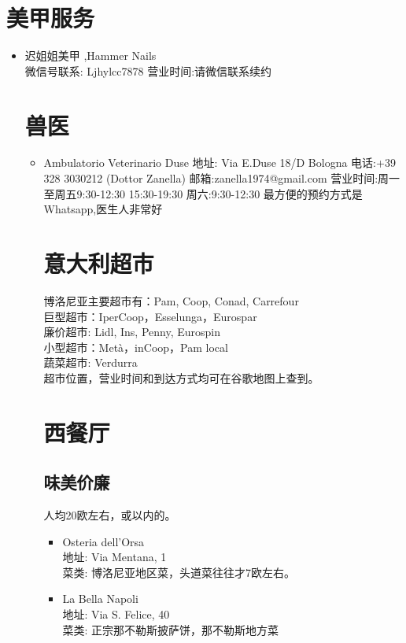 \section{美甲服务}
\begin{itemize}
\item 迟姐姐美甲 ,Hammer Nails\\
微信号联系: Ljhylcc7878
营业时间:请微信联系续约

\section{兽医}
\begin{itemize}
\item Ambulatorio Veterinario Duse
地址: Via E.Duse 18/D Bologna  电话:+39 328 3030212 (Dottor Zanella)
邮箱:zanella1974@gmail.com
营业时间:周一至周五9:30-12:30  15:30-19:30  周六:9:30-12:30
最方便的预约方式是Whatsapp,医生人非常好

\section{意大利超市}
\noindent 博洛尼亚主要超市有：Pam, Coop, Conad, Carrefour\\
巨型超市：IperCoop，Esselunga，Eurospar\\
廉价超市: Lidl, Ins, Penny, Eurospin\\
小型超市：Metà，inCoop，Pam local\\
蔬菜超市: Verdurra\\
超市位置，营业时间和到达方式均可在谷歌地图上查到。

\section{西餐厅}

\subsection{味美价廉}
人均20欧左右，或以内的。

\begin{itemize}
\item Osteria dell'Orsa\\
地址: Via Mentana, 1\\
菜类: 博洛尼亚地区菜，头道菜往往才7欧左右。

\item La Bella Napoli\\
地址: Via S. Felice, 40\\
菜类: 正宗那不勒斯披萨饼，那不勒斯地方菜


\end{itemize}
\end{itemize}
\end{itemize}
